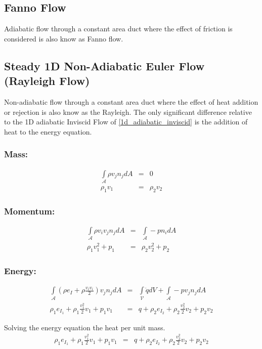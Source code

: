 \newpage	
\subsection{Fanno Flow}
Adiabatic flow through a constant area duct where the effect of friction is considered is also know as Fanno flow.

\newpage	
\subsection{Steady 1D Non-Adiabatic Euler Flow (Rayleigh Flow)} 
Non-adiabatic flow through a constant area duct where the effect of heat addition or rejection is also know as the
Rayleigh. The only significant difference relative to the 1D adiabatic Inviscid Flow of \ref{1d_adiabatic_inviscid} is the addition of heat to the energy equation.
\subsubsection*{Mass:}
 \begin{eqnarray}        
    \int\limits_{\mathcal{A}} \rho v_j n_j dA &=& 0 \\ 
    \rho_1 v_1  &=&\rho_2 v_2 
\end{eqnarray}        

     
\subsubsection*{Momentum:}
\begin{eqnarray}        
    \int\limits_{\mathcal{A}} \rho v_i v_j n_j dA &=& \int\limits_{\mathcal{A}} - p n_i dA \\ 
    \rho_1 v^2_1 + p_1&=&  \rho_2 v^2_2 + p_2
\end{eqnarray}        

\subsubsection*{Energy:}
\begin{eqnarray}        
     \int\limits_{\mathcal{A}} (\rho e_I + \rho\frac{v_i v_i}{2}) v_j n_j dA &=&  \int\limits_{\mathcal{V}} \dot{q} dV + \int\limits_{\mathcal{A}} - p v_j n_j dA \\ 
     \rho_1 e_{I_1} + \rho_1\frac{v^2_1 }{2} v_1  + p_1 v_1 &=& q + \rho_2 e_{I_2} + \rho_2\frac{v^2_2 }{2} v_2 +  p_2 v_2  
\end{eqnarray}        

Solving the energy equation the heat per unit mass.
\begin{eqnarray} 
     \rho_1 e_{I_1} + \rho_1\frac{v^2_1 }{2} v_1  + p_1 v_1 &=& q + \rho_2 e_{I_2} + \rho_2\frac{v^2_2 }{2} v_2 +  p_2 v_2  
\end{eqnarray}





